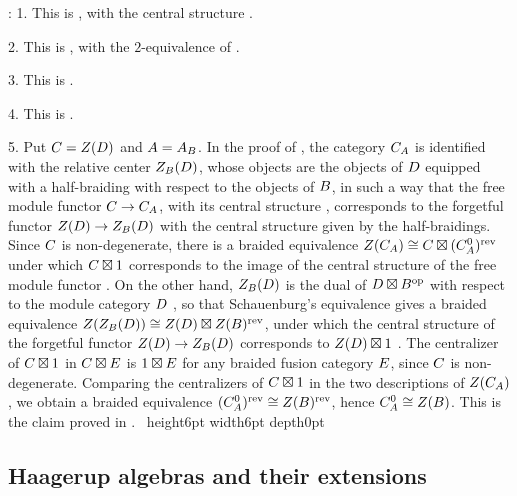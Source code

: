 \documentclass[leqno]{article}
\let\cal\relax
\newcommand{\cal}{\mathcal}
\newcommand{\qed}{\hfill \vrule height6pt  width6pt depth0pt}
\newenvironment{proof}[1][]{\noindent {\it Proof #1} : }{\hbox{~}\qed
\smallskip
}
\numberwithin{equation}{section}
\begin{document}
\begin{proof}
1. This is \cite[Corollary 4.1 p.~16]{DMNO13}, with the central structure \cite[(17) p.~10]{DMNO13}.

2. This is \cite[Proposition 4.8 and Remark 4.9 p.~17]{DMNO13}, with the $2$-equivalence of \cite[Proposition 4.4 p.~16]{DMNO13}.

3. This is \cite[Theorem 4.10 p.~18]{DMNO13}.

4. This is \cite[Section 3.6 and Proposition 3.16 p.~12]{DMNO13}.

5. Put $\cal C = Z(\cal D)$ and $A = A_{\cal B}$. In the proof of \cite[Theorem 4.10 p.~18]{DMNO13}, the category $\cal C_A$ is identified with the relative center $Z_{\cal B}(\cal D)$, whose objects are the objects of $\cal D$ equipped with a half-braiding with respect to the objects of $\cal B$, in such a way that the free module functor $\cal C \to \cal C_A$, with its central structure \cite[(17) p.~10]{DMNO13}, corresponds to the forgetful functor $Z(\cal D) \to Z_{\cal B}(\cal D)$ with the central structure given by the half-braidings. Since $\cal C$ is non-degenerate, there is a braided equivalence $Z(\cal C_A) \cong \cal C \boxtimes (\cal C_A^0)^{\mathrm{rev}}$ under which $\cal C \boxtimes 1$ corresponds to the image of the central structure of the free module functor \cite[Corollary 3.30 and Remark 3.31 p.~15]{DMNO13}. On the other hand, $Z_{\cal B}(\cal D)$ is the dual of $\cal D \boxtimes \cal B^{\mathrm{op}}$ with respect to the module category $\cal D$ \cite[p.~18]{DMNO13}, so that Schauenburg's equivalence \cite[(12) p.~7]{DMNO13} gives a braided equivalence $Z(Z_{\cal B}(\cal D)) \cong Z(\cal D) \boxtimes Z(\cal B)^{\mathrm{rev}}$, under which the central structure of the forgetful functor $Z(\cal D) \to Z_{\cal B}(\cal D)$ corresponds to $Z(\cal D) \boxtimes 1$ \cite[pp.~18--19]{DMNO13}. The centralizer of $\cal C \boxtimes 1$ in $\cal C \boxtimes \cal E$ is $1 \boxtimes \cal E$ for any braided fusion category $\cal E$, since $\cal C$ is non-degenerate. Comparing the centralizers of $\cal C \boxtimes 1$ in the two descriptions of $Z(\cal C_A)$, we obtain a braided equivalence $(\cal C_A^0)^{\mathrm{rev}} \cong Z(\cal B)^{\mathrm{rev}}$, hence $\cal C_A^0 \cong Z(\cal B)$. This is the claim proved in \cite[proof of Theorem 4.10 p.~18]{DMNO13}.
\end{proof}

\subsection{Haagerup algebras and their extensions}
\label{subsec:haagerup-algebras}
\end{document}
